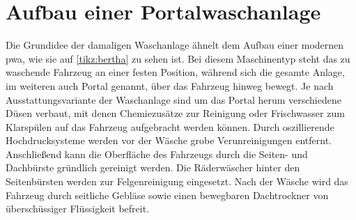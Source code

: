 \section{Aufbau einer Portalwaschanlage}
Die Grundidee der damaligen Waschanlage ähnelt dem Aufbau einer modernen \ac{pwa}, wie sie auf  \autoref{tikz:bertha} zu sehen ist. Bei diesem Maschinentyp steht das zu waschende Fahrzeug an einer festen Position, während sich die gesamte Anlage, im weiteren auch Portal genannt, über das Fahrzeug hinweg bewegt. Je nach Ausstattungsvariante der Waschanlage sind um das Portal herum verschiedene Düsen verbaut, mit denen Chemiezusätze zur Reinigung oder Frischwasser zum Klarspülen auf das Fahrzeug aufgebracht werden können. Durch oszillierende Hochdrucksysteme werden vor der Wäsche grobe Verunreinigungen entfernt. Anschließend kann die Oberfläche des Fahrzeugs durch die Seiten- und Dachbürste gründlich gereinigt werden. Die Räderwäscher hinter den Seitenbürsten werden zur Felgenreinigung eingesetzt. Nach der Wäsche wird das Fahrzeug durch seitliche Gebläse sowie einen bewegbaren Dachtrockner von überschüssiger Flüssigkeit befreit. 

